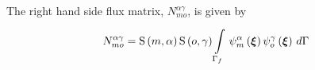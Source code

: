The right hand side flux matrix, $N^{\alpha\gamma}_{mo}$, is given by
\begin{equation}
  N^{\alpha\gamma}_{mo} =    \mathrm{S} \left( m,\alpha \right)     \mathrm{S} \left( o,\gamma \right)  
    \displaystyle\int\limits_{\Gamma_{f}}^{} \,   \psi_{m}^{\alpha} \left( \boldsymbol{\xi} \right)     \psi_{o}^{\gamma} \left( \boldsymbol{\xi} \right)  \,d\Gamma 
\end{equation}





